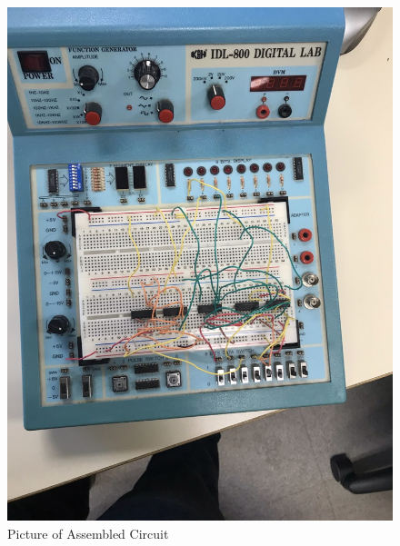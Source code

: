 \documentclass[11pt]{article}
\begin{document}
\begin{center}
	\begin{figure}
		\includegraphics[width=1\textwidth]{thumbnail_Image.jpg}
		\caption{Picture of Assembled Circuit}
	\end{figure}
\end{center}
\end{document}
